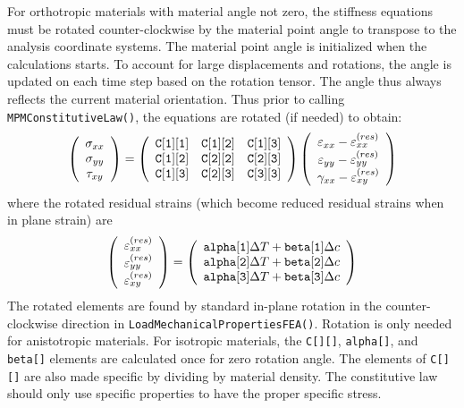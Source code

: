 \documentclass[11pt]{book}
\def\code#1{{\small\tt #1}}
\def\DT{\Delta T}
\def\e#1{\varepsilon_{#1}}
\def\er#1{\varepsilon_{#1}^{(res)}}
\def\g#1{\gamma_{#1}}
\def\s#1{\sigma_{#1}}
\def\symmat#1#2#3#4#5#6{\left(\begin{array}{ccc} #1 & #2 & #3 \\ #2 & #4 & #5 \\
                                                      #3 & #5 & #6 \end{array}\right)}
\def\t#1{\tau_{#1}}
\def\vvec#1#2#3{\left(\begin{array}{ccc} #1 \\ #2 \\ #3 \end{array}\right)}
\begin{document}
For orthotropic materials with material angle not zero, the stiffness equations must be rotated counter-clockwise by the material point angle to transpose to the analysis coordinate systems. The material point angle is initialized when the calculations starts. To account for large displacements and rotations, the angle is updated on each time step based on the rotation tensor. The angle thus always reflects the current material orientation. Thus prior to calling \code{MPMConstitutiveLaw()}, the equations are rotated (if needed) to obtain:
\begin{equation}
      \vvec{\s{xx}}{\s{yy}}{\t{xy}} = \symmat{\code{C[1][1]}}{\code{C[1][2]}}
                      {\code{C[1][3]}}{\code{C[2][2]}}{\code{C[2][3]}}{\code{C[3][3]}}
          \vvec{\e{xx} - \er{xx}}{\e{yy} - \er{yy}}{\g{xx}-\er{xy}}
 \end{equation}
 where the rotated residual strains (which become reduced residual strains when in plane strain) are
\begin{equation}
\left(\begin{array}{c} \er{xx} \\ \er{yy} \\ \er{xy} \end{array}\right)
       =  \left(\begin{array}{c}
	\code{alpha[1]}\DT + \code{beta[1]}\Delta c \\
	\code{alpha[2]}\DT + \code{beta[2]}\Delta c \\
	\code{alpha[3]}\DT + \code{beta[3]}\Delta c  \end{array}\right)
\end{equation}
 The rotated elements are found by standard in-plane rotation in the counter-clockwise direction in \code{LoadMechanicalPropertiesFEA()}. Rotation is only needed for anistotropic materials. For isotropic materials, the \code{C[][]}, \code{alpha[]}, and \code{beta[]} elements are calculated once for zero rotation angle. The elements of \code{C[][]} are also made specific by dividing by material density. The constitutive law should only use specific properties to have the proper specific stress.
 
\end{document}

